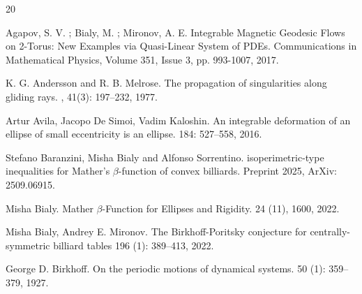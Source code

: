 \documentclass[12pt, openany]{amsart}
\theoremstyle{definition}
\theoremstyle{remark}
\theoremstyle{remark}
\theoremstyle{theorem}
\theoremstyle{theorem}
\theoremstyle{theorem}
\theoremstyle{theorem}
\begin{document}
\begin{thebibliography}{20}

 Agapov, S. V. ; Bialy, M. ; Mironov, A. E. 
 \newblock  Integrable Magnetic Geodesic Flows on 2-Torus: New Examples via Quasi-Linear System of PDEs.
 \newblock Communications in Mathematical Physics, Volume 351, Issue 3, pp. 993-1007, 2017.


K. G. Andersson and R. B. Melrose.
\newblock The propagation of singularities along gliding rays.
, 41(3): 197--232, 1977.




Artur Avila, Jacopo De Simoi, Vadim Kaloshin. 
\newblock An integrable deformation of an ellipse of small
eccentricity is an ellipse. 
 184: 527--558, 2016.

%
%

Stefano Baranzini, Misha Bialy and Alfonso Sorrentino.
\newblock  isoperimetric-type inequalities for Mather's $\beta$-function of convex billiards.
\newblock Preprint 2025, ArXiv: 2509.06915.

Misha Bialy.
\newblock Mather $\beta$-Function for Ellipses and Rigidity.
 24 (11), 1600, 2022.

Misha Bialy, Andrey E. Mironov.
\newblock The Birkhoff-Poritsky conjecture for centrally-symmetric billiard tables
 196 (1): 389--413, 2022.



George D. Birkhoff.
\newblock On the periodic motions of dynamical systems.
 50 (1): 359--379, 1927.


\end{thebibliography}
\end{document}
